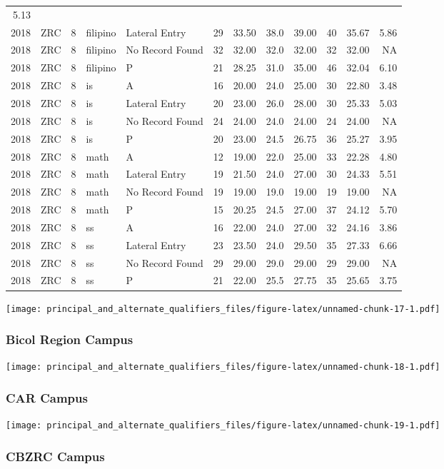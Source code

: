 \documentclass[]{article}
\begin{document}
\begin{longtable}[]{@{}rlrllrrrrrrr@{}}
5.13\tabularnewline
2018 & ZRC & 8 & filipino & Lateral Entry & 29 & 33.50 & 38.0 & 39.00 &
40 & 35.67 & 5.86\tabularnewline
2018 & ZRC & 8 & filipino & No Record Found & 32 & 32.00 & 32.0 & 32.00
& 32 & 32.00 & NA\tabularnewline
2018 & ZRC & 8 & filipino & P & 21 & 28.25 & 31.0 & 35.00 & 46 & 32.04 &
6.10\tabularnewline
2018 & ZRC & 8 & is & A & 16 & 20.00 & 24.0 & 25.00 & 30 & 22.80 &
3.48\tabularnewline
2018 & ZRC & 8 & is & Lateral Entry & 20 & 23.00 & 26.0 & 28.00 & 30 &
25.33 & 5.03\tabularnewline
2018 & ZRC & 8 & is & No Record Found & 24 & 24.00 & 24.0 & 24.00 & 24 &
24.00 & NA\tabularnewline
2018 & ZRC & 8 & is & P & 20 & 23.00 & 24.5 & 26.75 & 36 & 25.27 &
3.95\tabularnewline
2018 & ZRC & 8 & math & A & 12 & 19.00 & 22.0 & 25.00 & 33 & 22.28 &
4.80\tabularnewline
2018 & ZRC & 8 & math & Lateral Entry & 19 & 21.50 & 24.0 & 27.00 & 30 &
24.33 & 5.51\tabularnewline
2018 & ZRC & 8 & math & No Record Found & 19 & 19.00 & 19.0 & 19.00 & 19
& 19.00 & NA\tabularnewline
2018 & ZRC & 8 & math & P & 15 & 20.25 & 24.5 & 27.00 & 37 & 24.12 &
5.70\tabularnewline
2018 & ZRC & 8 & ss & A & 16 & 22.00 & 24.0 & 27.00 & 32 & 24.16 &
3.86\tabularnewline
2018 & ZRC & 8 & ss & Lateral Entry & 23 & 23.50 & 24.0 & 29.50 & 35 &
27.33 & 6.66\tabularnewline
2018 & ZRC & 8 & ss & No Record Found & 29 & 29.00 & 29.0 & 29.00 & 29 &
29.00 & NA\tabularnewline
2018 & ZRC & 8 & ss & P & 21 & 22.00 & 25.5 & 27.75 & 35 & 25.65 &
3.75\tabularnewline
\bottomrule
\end{longtable}

\texttt{[image: principal\_and\_alternate\_qualifiers\_files/figure-latex/unnamed-chunk-17-1.pdf]}

\hypertarget{bicol-region-campus}{%
\subsubsection{Bicol Region Campus}\label{bicol-region-campus}}

\texttt{[image: principal\_and\_alternate\_qualifiers\_files/figure-latex/unnamed-chunk-18-1.pdf]}

\hypertarget{car-campus}{%
\subsubsection{CAR Campus}\label{car-campus}}

\texttt{[image: principal\_and\_alternate\_qualifiers\_files/figure-latex/unnamed-chunk-19-1.pdf]}

\hypertarget{cbzrc-campus}{%
\subsubsection{CBZRC Campus}\label{cbzrc-campus}}
\end{document}
